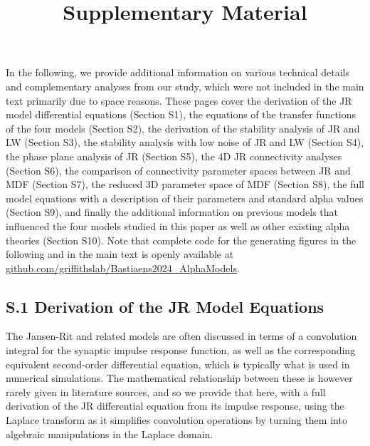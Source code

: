 \documentclass[12pt,twoside]{article}
\title{Supplementary Material}
\date{}
\begin{document}
\maketitle
In the following, we provide additional information on various technical details and complementary analyses from our study, which were not included in the main text primarily due to space reasons. These pages cover the derivation of the JR model differential equations (Section S1), the equations of the transfer functions of the four models (Section S2), the derivation of the stability analysis of JR and LW (Section S3), the stability analysis with low noise of JR and LW (Section S4), the phase plane analysis of JR (Section S5), the 4D JR connectivity analyses (Section S6), the comparison of connectivity parameter spaces between JR and MDF (Section S7), the reduced 3D parameter space of MDF (Section S8), the full model equations with a description of their parameters and standard alpha values (Section S9), and finally the additional information on previous models that influenced the four models studied in this paper as well as other existing alpha theories (Section S10).
Note that complete code for the generating figures in the following and in the main text is openly available at \url{github.com/griffithslab/Bastiaens2024_AlphaModels}.


\newpage
\subsection*{S.1 Derivation of the JR Model Equations}

The Jansen-Rit and related models are often discussed in terms of a convolution integral for the synaptic impulse response function, as well as the corresponding equivalent second-order differential equation, which is typically what is used in numerical simulations. The mathematical relationship between these is however rarely given in literature sources, and so we provide that here, with a full derivation of the JR differential equation from its impulse response, using the Laplace transform as it simplifies convolution operations by turning them into algebraic manipulations in the Laplace domain.
\end{document}
